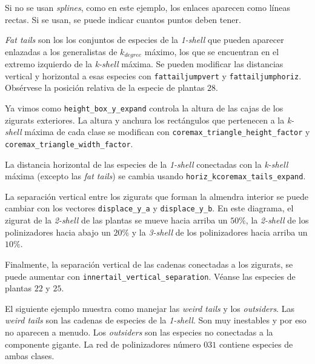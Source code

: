 Si no se usan \textit{splines}, como en este ejemplo, los enlaces aparecen como líneas rectas. Si se usan, se puede indicar cuantos puntos deben tener.

\textit{Fat tails} son los los conjuntos de especies de la \textit{1-shell} que pueden aparecer enlazadas a los generalistas de $k_{degree}$ máximo, los que se encuentran en el extremo izquierdo de la \textit{k-shell} máxima. Se pueden modificar las distancias vertical y horizontal a esas especies con \texttt{fattailjumpvert} y \texttt{fattailjumphoriz}. Obsérvese la posición relativa de la especie de plantas $28$.

Ya vimos como \texttt{height\_box\_y\_expand} controla la altura de las cajas de los zigurats exteriores. La altura y anchura los rectángulos que pertenecen a la \textit{k-shell} máxima de cada clase se modifican con \texttt{coremax\_triangle\_height\_factor} y \texttt{coremax\_triangle\_width\_factor}. 

La distancia horizontal de las especies de la \textit{1-shell} conectadas con la \textit{k-shell} máxima (excepto las \textit{fat tails}) se cambia usando \texttt{horiz\_kcoremax\_tails\_expand}.

La separación vertical entre los zigurats que forman la almendra interior se puede cambiar con los vectores \texttt{displace\_y\_a} y \texttt{displace\_y\_b}. En este diagrama, el zigurat de la \textit{2-shell} de las plantas se mueve hacia arriba un $50\%$, la \textit{2-shell} de los polinizadores hacia abajo un $20\%$ y la \textit{3-shell} de los polinizadores hacia arriba un $10\%$.

Finalmente, la separación vertical de las cadenas conectadas a los zigurats, se puede aumentar con \texttt{innertail\_vertical\_separation}. Véanse las especies de plantas $22$ y $25$.

El siguiente ejemplo muestra como manejar las \textit{weird tails} y los \textit{outsiders}. Las \textit{weird tails} son las cadenas de especies de la \textit{1-shell}. Son muy inestables y por eso no aparecen a menudo. Los \textit{outsiders} son las especies no conectadas a la componente gigante. La red de polinizadores número $031$ contiene especies de ambas clases.

